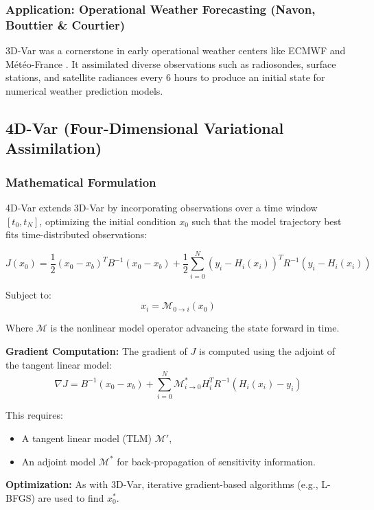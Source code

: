 \documentclass[a4paper]{article}
\begin{document}
\subsubsection*{Application: Operational Weather Forecasting (Navon, Bouttier \& Courtier)}

3D-Var was a cornerstone in early operational weather centers like ECMWF and Météo-France \parencite{navon2009data, courtier1999assimilation}. It assimilated diverse observations such as radiosondes, surface stations, and satellite radiances every 6 hours to produce an initial state for numerical weather prediction models.

\subsection{4D-Var (Four-Dimensional Variational Assimilation)}

\subsubsection*{Mathematical Formulation}

4D-Var extends 3D-Var by incorporating observations over a time window $[t_0, t_N]$, optimizing the initial condition $x_0$ such that the model trajectory best fits time-distributed observations:

\[
J(x_0) = \frac{1}{2}(x_0 - x_b)^T B^{-1}(x_0 - x_b) + \frac{1}{2} \sum_{i=0}^{N} \left( y_i - H_i(x_i) \right)^T R^{-1} \left( y_i - H_i(x_i) \right)
\]

Subject to:
\[
x_i = \mathcal{M}_{0 \rightarrow i}(x_0)
\]

Where $\mathcal{M}$ is the nonlinear model operator advancing the state forward in time.

\textbf{Gradient Computation:}
The gradient of $J$ is computed using the adjoint of the tangent linear model:
\[
\nabla J = B^{-1}(x_0 - x_b) + \sum_{i=0}^{N} \mathcal{M}^*_{i \rightarrow 0} H_i^T R^{-1}(H_i(x_i) - y_i)
\]

This requires:
\begin{itemize}
  \item A tangent linear model (TLM) $\mathcal{M}'$,
  \item An adjoint model $\mathcal{M}^*$ for back-propagation of sensitivity information.
\end{itemize}

\textbf{Optimization:} As with 3D-Var, iterative gradient-based algorithms (e.g., L-BFGS) are used to find $x_0^*$.
\end{document}
